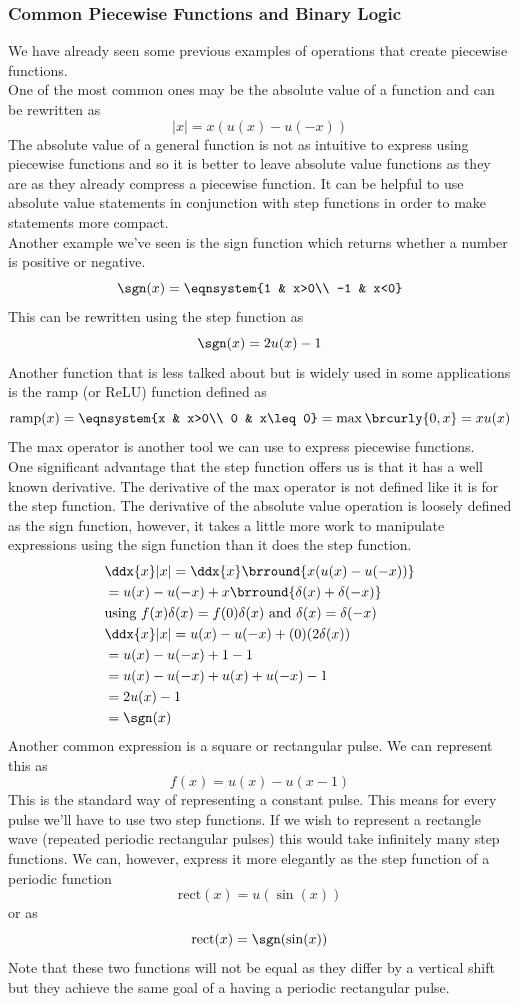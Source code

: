 \subsubsection{Common Piecewise Functions and Binary Logic}
We have already seen some previous examples of operations that create piecewise functions.\\
One of the most common ones may be the absolute value of a function and can be rewritten as
$$|x|=x(u(x)-u(-x))$$
The absolute value of a general function is not as intuitive to express using piecewise functions and so it is better to leave absolute value functions as they are as they already compress a piecewise function. It can be helpful to use absolute value statements in conjunction with step functions in order to make statements more compact.\\
Another example we've seen is the sign function which returns whether a number is positive or negative.
$$\sgn(x)=\eqnsystem{1 & x>0\\ -1 & x<0}$$
This can be rewritten using the step function as
$$\sgn(x)=2u(x)-1$$
Another function that is less talked about but is widely used in some applications is the ramp (or ReLU) function defined as
$$\mathrm{ramp}(x)=\eqnsystem{x & x>0\\ 0 & x\leq 0}=\max\brcurly{0,x}=xu(x)$$
The max operator is another tool we can use to express piecewise functions.\\
One significant advantage that the step function offers us is that it has a well known derivative. The derivative of the max operator is not defined like it is for the step function. The derivative of the absolute value operation is loosely defined as the sign function, however, it takes a little more work to manipulate expressions using the sign function than it does the step function.
\begin{align*}
    &\ddx{x}|x|=\ddx{x}\brround{x(u(x)-u(-x))}\\
    &=u(x)-u(-x)+x\brround{\delta(x)+\delta(-x)}\\
    &\text{using }f(x)\delta(x)=f(0)\delta(x)\text{ and }\delta(x)=\delta(-x)\\
    &\ddx{x}|x|=u(x)-u(-x)+(0)(2\delta(x))\\
    &=u(x)-u(-x)+1-1\\
    &=u(x)-u(-x)+u(x)+u(-x)-1\\
    &=2u(x)-1\\
    &=\sgn(x)
\end{align*}
Another common expression is a square or rectangular pulse. We can represent this as
$$f(x)=u(x)-u(x-1)$$
This is the standard way of representing a constant pulse. This means for every pulse we'll have to use two step functions. If we wish to represent a rectangle wave (repeated periodic rectangular pulses) this would take infinitely many step functions. We can, however, express it more elegantly as the step function of a periodic function
$$\mathrm{rect}(x)=u(\sin(x))$$
or as
$$\mathrm{rect}(x)=\sgn(\sin(x))$$
Note that these two functions will not be equal as they differ by a vertical shift but they achieve the same goal of a having a periodic rectangular pulse.\\

